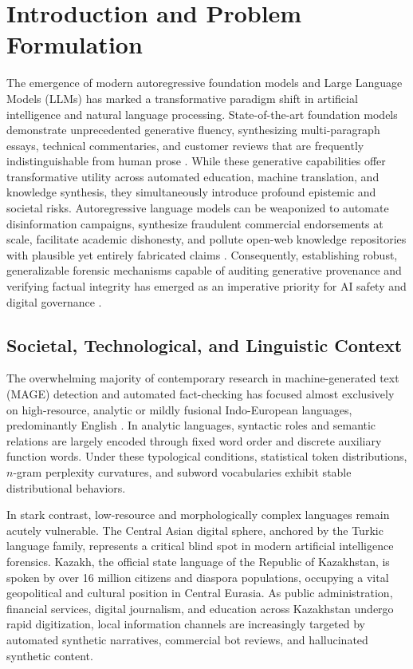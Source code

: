 \chapter{Introduction and Problem Formulation}
\label{chap:introduction}

The emergence of modern autoregressive foundation models and Large Language Models (LLMs) has marked a transformative paradigm shift in artificial intelligence and natural language processing. State-of-the-art foundation models demonstrate unprecedented generative fluency, synthesizing multi-paragraph essays, technical commentaries, and customer reviews that are frequently indistinguishable from human prose \citep{devlin2019bert,touvron2023llama,qwen2024}. While these generative capabilities offer transformative utility across automated education, machine translation, and knowledge synthesis, they simultaneously introduce profound epistemic and societal risks. Autoregressive language models can be weaponized to automate disinformation campaigns, synthesize fraudulent commercial endorsements at scale, facilitate academic dishonesty, and pollute open-web knowledge repositories with plausible yet entirely fabricated claims \citep{uchendu2020authorship,sadasivan2023can,chakraborty2023possibilities}. Consequently, establishing robust, generalizable forensic mechanisms capable of auditing generative provenance and verifying factual integrity has emerged as an imperative priority for AI safety and digital governance \citep{mitchell2023detectgpt,wang2024raid}.

\section{Societal, Technological, and Linguistic Context}
\label{sec:intro_context}

The overwhelming majority of contemporary research in machine-generated text (MAGE) detection and automated fact-checking has focused almost exclusively on high-resource, analytic or mildly fusional Indo-European languages, predominantly English \citep{gehrmann2019gltr,kirchenbauer2023watermark,hans2024binoculars,wang2024raid}. In analytic languages, syntactic roles and semantic relations are largely encoded through fixed word order and discrete auxiliary function words. Under these typological conditions, statistical token distributions, $n$-gram perplexity curvatures, and subword vocabularies exhibit stable distributional behaviors.

In stark contrast, low-resource and morphologically complex languages remain acutely vulnerable. The Central Asian digital sphere, anchored by the Turkic language family, represents a critical blind spot in modern artificial intelligence forensics. Kazakh, the official state language of the Republic of Kazakhstan, is spoken by over 16 million citizens and diaspora populations, occupying a vital geopolitical and cultural position in Central Eurasia. As public administration, financial services, digital journalism, and education across Kazakhstan undergo rapid digitization, local information channels are increasingly targeted by automated synthetic narratives, commercial bot reviews, and hallucinated synthetic content.

